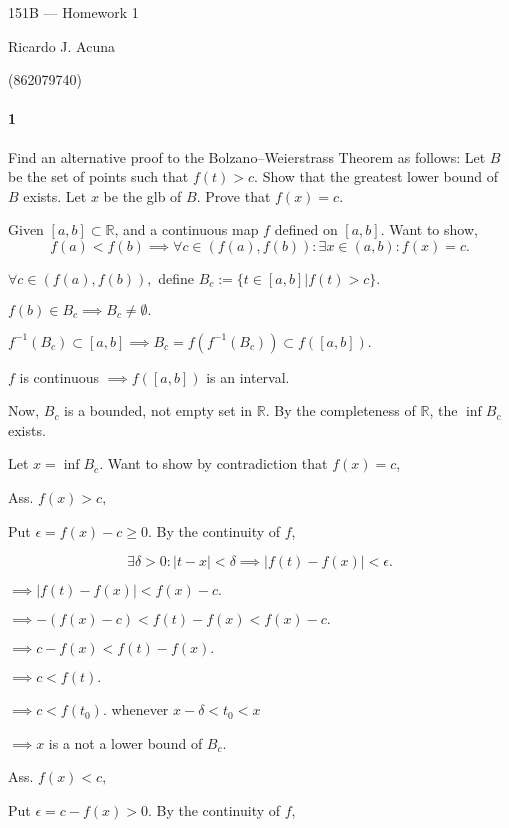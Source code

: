 \documentclass{article}
\newcommand\R{\mathbb{R}}
\begin{document}
\begin{center}
  151B --- Homework 1

  Ricardo J. Acuna

  (862079740)
\end{center}\vspace{1.618em}

\paragraph{1} Find an alternative proof to the Bolzano–Weierstrass Theorem as follows: Let $B$ be the
set of points such that $f(t) > c$. Show that the greatest lower bound of $B$ exists. Let $x$ be
the glb of $B$. Prove that $f(x) = c$.


Given $[a,b]\subset \R$, and a continuous map $f$
defined on $[a,b]$. Want to show,
\[f(a)<f(b) \implies \forall c\in (f(a),f(b)):
\exists x\in(a,b): f(x) = c.\]

$\forall c \in(f(a),f(b)),$ define $ B_c:=\{t \in [a,b]| f(t) > c\}.$

$f(b) \in B_c \implies B_c \neq \emptyset .$

$f^{-1}(B_c)\subset [a,b] \implies B_c = f(f^{-1}(B_c)) \subset
f([a,b]) .$

$f$ is continuous $\implies f([a,b])$ is an interval.

Now, $B_c$ is a bounded, not empty set in $\R$. By the completeness of
$\R$, the $\inf B_c$ exists.

Let $x = \inf B_c$. Want to show by contradiction that $f(x) = c$,

Ass. $f(x) > c ,$

Put $\epsilon = f(x) - c \geq 0$. By the continuity of $f$,

\[\exists \delta > 0: |t - x | < \delta \implies |f(t) - f(x)| <
  \epsilon.\]

$\implies |f(t) - f(x)| < f(x) - c.$

$\implies -(f(x) - c) < f(t) - f(x) < f(x) - c.$

$\implies c -f(x) < f(t) - f(x).$

$\implies c < f(t).$

$\implies c < f(t_0).$ whenever $ x-\delta < t_0 <x$

$\implies x$ is a not a lower bound of $B_c.$

Ass. $f(x) < c,$

Put $\epsilon = c - f(x) > 0$. By the continuity of $f$,
\end{document}

